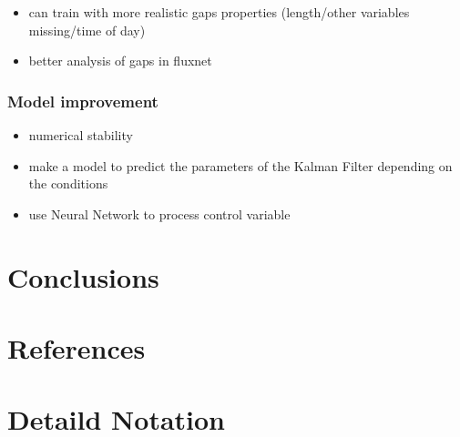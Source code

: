 \documentclass{article}
\let\Oldsection\section
\renewcommand{\section}{\FloatBarrier\Oldsection}
\let\Oldsubsubsection\subsubsection
\renewcommand{\subsubsection}{\FloatBarrier\Oldsubsubsection}
\begin{document}
\begin{itemize}
    \item can train with more realistic gaps properties (length/other variables missing/time of day)
    \item better analysis of gaps in fluxnet
\end{itemize}

\subsubsection{Model improvement}

\begin{itemize}
\item numerical stability
\item make a model to predict the parameters of the Kalman Filter depending on the conditions
\item use Neural Network to process control variable
\end{itemize}



\section{Conclusions}



\section*{References}

\printbibliography

\appendix

\section{Detaild Notation}
\end{document}
